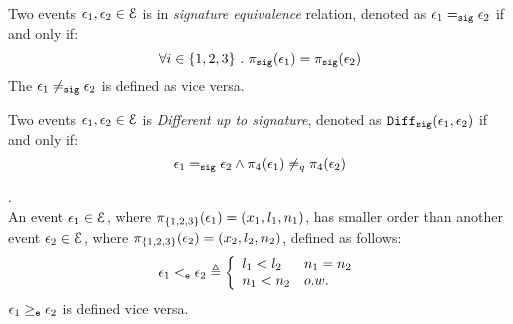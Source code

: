 %
%
\begin{defn}
Two events $\mathtt{\epsilon}_1, \mathtt{\epsilon}_2 \in \mathcal{E}$ is in \emph{signature equivalence} relation, denoted as $\mathtt{\epsilon}_1 =_{\mathtt{sig}} \mathtt{\epsilon}_2$ if and only if:
\[
\forall i \in \{1, 2, 3\} ~.~ \pi_{\mathtt{sig}}(\mathtt{\epsilon}_1) = \pi_{\mathtt{sig}}(\mathtt{\epsilon}_2) 
\]
The $\mathtt{\epsilon}_1 \neq_{\mathtt{sig}} \mathtt{\epsilon}_2$ is defined as vice versa.
\end{defn}
%
\begin{defn}
Two events $\mathtt{\epsilon}_1, \mathtt{\epsilon}_2 \in \mathcal{E}$ is \emph{Different up to signature}, 
denoted as $\mathtt{Diff}_{\mathtt{sig}}(\mathtt{\epsilon}_1, \mathtt{\epsilon}_2)$ if and only if:
\[
\mathtt{\epsilon}_1 =_{\mathtt{sig}} \mathtt{\epsilon}_2 \land  \pi_{4}(\mathtt{\epsilon}_1) \neq_q \pi_{4}(\mathtt{\epsilon}_2)
\]
\end{defn}
%
\begin{defn}.
\label{def:query_dir}
\\
An event $\mathtt{\epsilon}_1 \in \mathcal{E}$, where $\pi_{\{1, 2, 3\}}(\mathtt{\epsilon}_1) = (x_1, l_1, n_1)$,
has smaller order than another event $\mathtt{\epsilon}_2 \in \mathcal{E}$, 
where 
$ \pi_{\{1, 2, 3\}}(\mathtt{\epsilon}_2) = (x_2, l_2, n_2)$, defined as follows:
%
\[
\event_1 \eventlt \event_2
\triangleq 
\left\{
\begin{array}{ll}
  l_1 < l_2 & n_1 = n_2
  \\
  n_1 < n_2  & o.w.
\end{array}  
\right.
\]
%
$\mathtt{\epsilon}_1 \geq_{\mathtt{e}} \mathtt{\epsilon}_2$  is defined vice versa.
\end{defn}
%
%